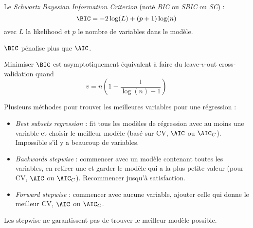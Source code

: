        \begin{definition}
            Le \textit{Schwartz Bayesian Information Criterion} (noté \textit{BIC} ou \textit{SBIC} ou \textit{SC}) :
            \[
                \BIC = -2\log(L) + (p + 1)\log(n)
            \]
            avec \(L\) la likelihood et \(p\) le nombre de variables dans le modèle.

            \(\BIC\) pénalise plus que \(\AIC\).

            Minimiser \(\BIC\) est asymptotiquement équivalent à faire du leave-\(v\)-out cross-validation quand \[v = n\left(1 - \frac{1}{\log(n) - 1}\right)\]
        \end{definition}

        Plusieurs méthodes pour trouver les meilleures variables pour une régression :
        \begin{itemize}
            \item \textit{Best subsets regression} : fit tous les modèles de régression avec au moins une variable et choisir le meilleur modèle (basé sur CV, \(\AIC\) ou \(\AIC_C\)). Impossible s'il y a beaucoup de variables.
            \item \textit{Backwards stepwise} : commencer avec un modèle contenant toutes les variables, en retirer une et garder le modèle qui a la plus petite valeur (pour CV, \(\AIC\) ou \(\AIC_C\)). Recommencer jusqu'à satisfaction.
            \item \textit{Forward stepwise} : commencer avec aucune variable, ajouter celle qui donne le meilleur CV, \(\AIC\) ou \(\AIC_C\).
        \end{itemize}
        \begin{remarque}
            Les stepwise ne garantissent pas de trouver le meilleur modèle possible.
        \end{remarque}
